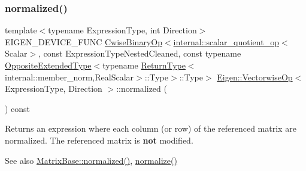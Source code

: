 \subsubsection{\texorpdfstring{normalized()}{normalized()}}
{\footnotesize\ttfamily template$<$typename Expression\+Type, int Direction$>$ \\
E\+I\+G\+E\+N\+\_\+\+D\+E\+V\+I\+C\+E\+\_\+\+F\+U\+NC \mbox{\hyperlink{class_eigen_1_1_cwise_binary_op}{Cwise\+Binary\+Op}}$<$\mbox{\hyperlink{struct_eigen_1_1internal_1_1scalar__quotient__op}{internal\+::scalar\+\_\+quotient\+\_\+op}}$<$Scalar$>$, const Expression\+Type\+Nested\+Cleaned, const typename \mbox{\hyperlink{struct_eigen_1_1_vectorwise_op_1_1_opposite_extended_type}{Opposite\+Extended\+Type}}$<$typename \mbox{\hyperlink{struct_eigen_1_1_vectorwise_op_1_1_return_type}{Return\+Type}}$<$internal\+::member\+\_\+norm,Real\+Scalar$>$\+::Type$>$\+::Type$>$ \mbox{\hyperlink{class_eigen_1_1_vectorwise_op}{Eigen\+::\+Vectorwise\+Op}}$<$ Expression\+Type, Direction $>$\+::normalized (\begin{DoxyParamCaption}{ }\end{DoxyParamCaption}) const\hspace{0.3cm}{\ttfamily [inline]}}

\begin{DoxyReturn}{Returns}
an expression where each column (or row) of the referenced matrix are normalized. The referenced matrix is {\bfseries{not}} modified. 
\end{DoxyReturn}
\begin{DoxySeeAlso}{See also}
\mbox{\hyperlink{class_eigen_1_1_matrix_base_a6ede5c8ebe9631fed9004fedbf9e4016}{Matrix\+Base\+::normalized()}}, \mbox{\hyperlink{class_eigen_1_1_vectorwise_op_a1d22c9442537bd654edb4604db7b7b57}{normalize()}} 
\end{DoxySeeAlso}
\mbox{\label{class_eigen_1_1_vectorwise_op_ae5190ecc9dad889b78a91720ea76d8d7}} 
